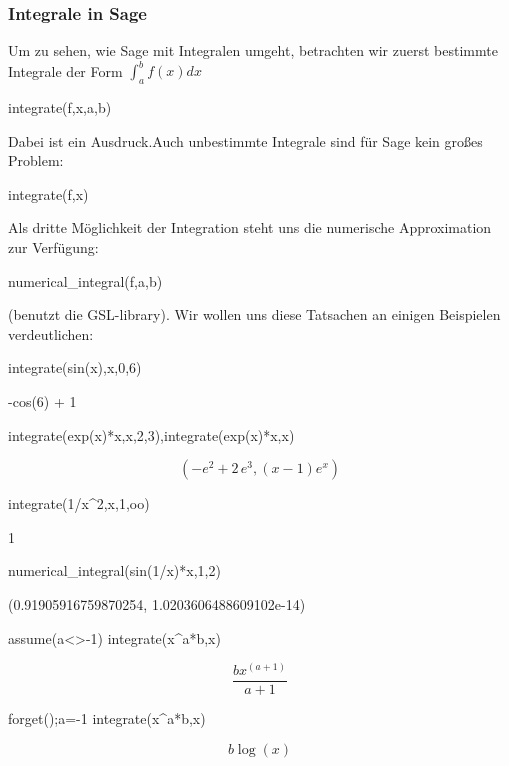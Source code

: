 \documentclass[fontsize=12pt,paper=a4,twoside,bibtotoc,idxtotoc,
liststotoc,pagesize,BCOR1.2cm,DIV15,chapterprefix,pagesize=pdftex]{scrbook}
\theoremstyle{plain}
\theoremstyle{definition}
\theoremstyle{remark}
\begin{document}
\subsubsection{Integrale in Sage}
Um zu sehen, wie Sage mit Integralen umgeht, betrachten wir zuerst bestimmte Integrale der Form $\int_a^b f(x) dx$
\begin{sagein}
integrate(f,x,a,b) 
\end{sagein}
Dabei ist  ein Ausdruck.Auch unbestimmte Integrale sind für Sage kein großes Problem:
\begin{sagein}
integrate(f,x)
\end{sagein}
Als dritte Möglichkeit der Integration steht uns die numerische Approximation zur Verfügung:
\begin{sagein}
numerical_integral(f,a,b) 
\end{sagein}
(benutzt die GSL-library).
Wir wollen uns diese Tatsachen an einigen Beispielen verdeutlichen:
\begin{sagein}
 integrate(sin(x),x,0,6)
\end{sagein}
\begin{sageout}
-cos(6) + 1
\end{sageout}
\begin{sagein}
integrate(exp(x)*x,x,2,3),integrate(exp(x)*x,x)
\end{sagein}
{\color{blue}\[\left(-e^{2} + 2 \, e^{3}, {\left(x - 1\right)} e^{x}\right)\]}
\begin{sagein}
integrate(1/x^2,x,1,oo)
\end{sagein}
\begin{sageout}
  1
\end{sageout}
\begin{sagein}
numerical_integral(sin(1/x)*x,1,2)
\end{sagein}
\begin{sageout}
  (0.91905916759870254, 1.0203606488609102e-14)
\end{sageout}
\begin{sagein}
assume(a<>-1)
integrate(x^a*b,x)
\end{sagein}
{\color{blue} \[ \frac{b x^{{\left(a + 1\right)}}}{a + 1}\]}
\begin{sagein}
forget();a=-1
integrate(x^a*b,x)
\end{sagein}
{\color{blue} \[ b \log\left(x\right)\]}
\end{document}
